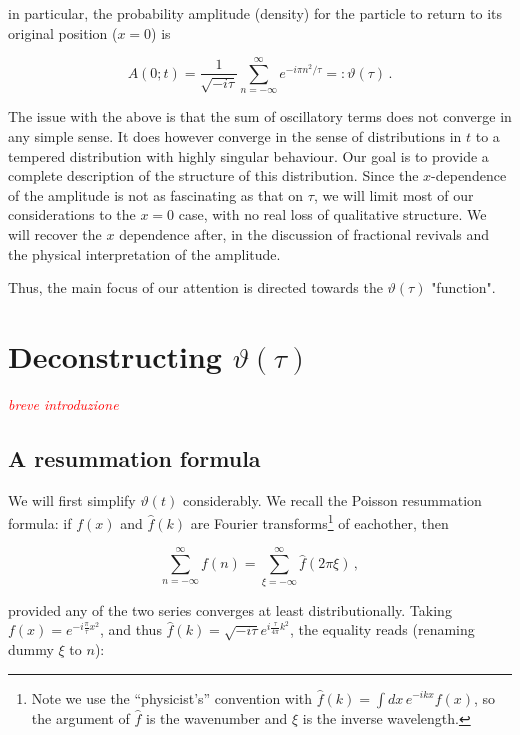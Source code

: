 \documentclass{article}
\newcommand{\T}{\ensuremath{\vartheta}}
\newcommand{\cmnt}[1]{\textcolor{red}{\emph{#1}}}
\newcommand{\sumZ}{\sum_{n=-\infty}^{\infty}}
\begin{document}
in particular, the probability amplitude (density) for the particle to return to its original position ($x=0$) is

\begin{equation}
    A(0;t) = \frac{1}{\sqrt{-i\tau}} \sumZ e^{-{i \pi n^2}/{\tau}} =: \T(\tau)\,.
\end{equation}


The issue with the above is that the sum of oscillatory terms does not converge in any simple sense. It does however converge in the sense of distributions in $t$ to a tempered distribution with highly singular behaviour. Our goal is to provide a complete description of the structure of this distribution. Since the $x$-dependence of the amplitude is not as fascinating as that on $\tau$, we will limit most of our considerations to the $x=0$ case, with no real loss of qualitative structure. We will recover the $x$ dependence after, in the discussion of fractional revivals and the physical interpretation of the amplitude.

Thus, the main focus of our attention is directed towards the $\T(\tau)$ "function".


\section{Deconstructing $\T(\tau)$}

\cmnt{breve introduzione}

\subsection{A resummation formula}\label{resummation}

We will first simplify $\T(t)$ considerably. We recall the Poisson resummation formula\cite{bellman}: if $f(x)$ and $\hat f(k)$ are Fourier transforms\footnote{Note we use the ``physicist's'' convention with $\hat f(k) = \int dx\, e^{-ikx} f(x)$, so the argument of $\hat f$ is the wavenumber and $\xi$ is the inverse wavelength.} of eachother, then

\begin{equation}
    \sumZ f(n) = \sum_{\xi=-\infty}^{\infty} \hat f(2\pi\xi)\,,
\end{equation}

provided any of the two series converges at least distributionally. Taking $f(x) = e^{-i\frac{\pi}{\tau} x^2 }$, and thus $\hat f(k) = \sqrt{-i\tau} e^{i \frac{\tau}{4\pi} k^2}$, the equality reads (renaming dummy $\xi$ to $n$):
\end{document}
